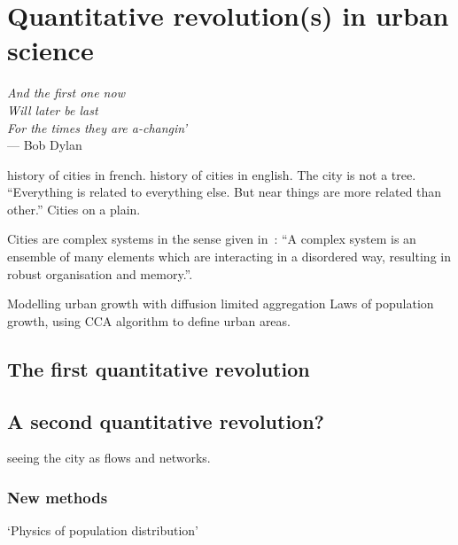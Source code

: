 


\chapter{Quantitative revolution(s) in urban science}
\label{chap:quantitative_revolutions}

\begin{flushright}{\slshape    
And the first one now\\
Will later be last\\
For the times they are a-changin'} \\ \medskip
--- Bob Dylan 
\end{flushright}

\cite{Bairoch:1985} history of cities in french.
\cite{Mumford:1961} history of cities in english.
\cite{Alexander:1964} The city is not a tree.
\cite{Tobler:1970} ``Everything is related to everything else. But near things
are more related than other.''
\cite{Glass:1971} Cities on a plain.


Cities are complex systems in the sense given in~\cite{Ladyman:2013}: ``A complex system is an ensemble of many elements
which are interacting in a disordered way, resulting in robust organisation and
memory.''.


\cite{Makse:1995} Modelling urban growth with diffusion limited aggregation
\cite{Rozenfeld:2008} Laws of population growth, using CCA algorithm to define
urban areas.

\section{The first quantitative revolution}
\label{sec:the_first_quantitative_revolution}


\section{A second quantitative revolution?}
\label{sec:a_second_quantitative_revolution_}

\cite{Batty:2008,Batty:2012,Batty:2013} seeing the city as flows and networks.

    \subsection{New methods}
    \label{sub:new_methods}

\cite{Stewart:1959} `Physics of population distribution'

